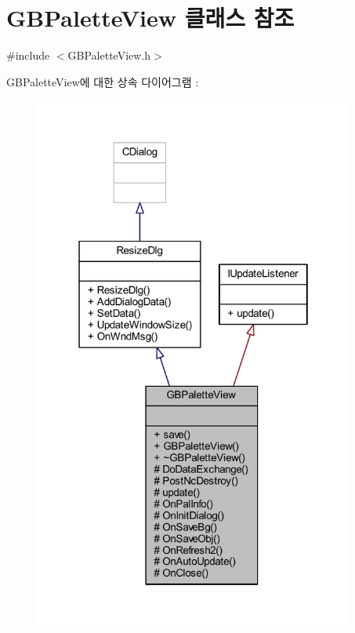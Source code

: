 \hypertarget{class_g_b_palette_view}{}\section{G\+B\+Palette\+View 클래스 참조}
\label{class_g_b_palette_view}


{\ttfamily \#include $<$G\+B\+Palette\+View.\+h$>$}



G\+B\+Palette\+View에 대한 상속 다이어그램 \+: \nopagebreak
\begin{figure}[H]
\begin{center}
\leavevmode
\includegraphics[width=298pt]{class_g_b_palette_view__inherit__graph}
\end{center}
\end{figure}


